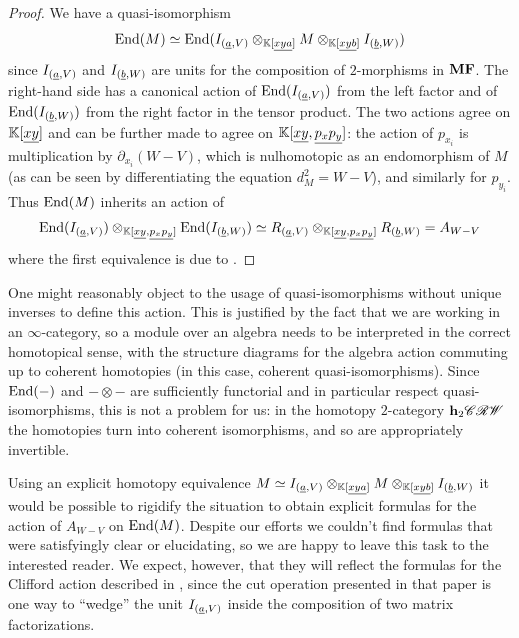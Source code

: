 \begin{proof}
	We have a quasi-isomorphism
	\begin{equation*}
		\mathrm{End}(M) \simeq \mathrm{End}(I_{(\underline{a}, V)} \otimes_{\mathbb{K}[\underline{xya}]} M \otimes_{\mathbb{K}[\underline{xyb}]} I_{(\underline{b},W)})
	\end{equation*}
	since $I_{(\underline{a}, V)}$ and $I_{(\underline{b},W)}$ are units for the composition of $2$-morphisms in $\mathbf{MF}$. The right-hand side has a canonical action of $\mathrm{End}(I_{(\underline{a}, V)})$ from the left factor and of $\mathrm{End}(I_{(\underline{b},W)})$ from the right factor in the tensor product. The two actions agree on $\mathbb{K}[\underline{xy}]$ and can be further made to agree on $\mathbb{K}[\underline{xy}, \underline{p_x p_y}]$: the action of $p_{x_i}$ is multiplication by $\partial_{x_i}(W - V)$, which is nulhomotopic as an endomorphism of $M$ (as can be seen by differentiating the equation $d_M^2 = W - V$), and similarly for $p_{y_i}$. Thus $\mathrm{End}(M)$ inherits an action of
	\begin{equation*}
		\mathrm{End}(I_{(\underline{a}, V)}) \otimes_{\mathbb{K}[\underline{xy},\underline{p_x p_y}]} \mathrm{End}(I_{(\underline{b},W)}) \simeq R_{(\underline{a}, V)} \otimes_{\mathbb{K}[\underline{xy},\underline{p_x p_y}]} R_{(\underline{b}, W)} = A_{W - V}
	\end{equation*}
	where the first equivalence is due to .
\end{proof}

One might reasonably object to the usage of quasi-isomorphisms without unique inverses to define this action. This is justified by the fact that we are working in an $\infty$-category, so a module over an algebra needs to be interpreted in the correct homotopical sense, with the structure diagrams for the algebra action commuting up to coherent homotopies (in this case, coherent quasi-isomorphisms). Since $\mathrm{End}(-)$ and $- \otimes -$ are sufficiently functorial and in particular respect quasi-isomorphisms, this is not a problem for us: in the homotopy $2$-category $\mathbf{h}_2 \mathscr{CRW}$ the homotopies turn into coherent isomorphisms, and so are appropriately invertible. 

Using an explicit homotopy equivalence $M \simeq I_{(\underline{a}, V)} \otimes_{\mathbb{K}[\underline{xya}]} M \otimes_{\mathbb{K}[\underline{xyb}]} I_{(\underline{b},W)}$ it would be possible to rigidify the situation to obtain explicit formulas for the action of $A_{W - V}$ on $\mathrm{End}(M)$. Despite our efforts we couldn't find formulas that were satisfyingly clear or elucidating, so we are happy to leave this task to the interested reader. We expect, however, that they will reflect the formulas for the Clifford action described in \cite{Murfet2018}, since the cut operation presented in that paper is one way to ``wedge'' the unit $I_{(\underline{a}, V)}$ inside the composition of two matrix factorizations.

